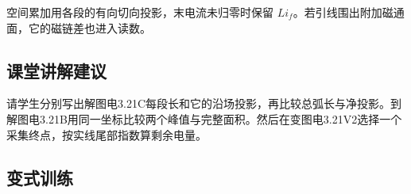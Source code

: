 \documentclass[UTF8,fontset=fandol,a4paper,11pt]{ctexart}
\begin{document}
空间累加用各段的有向切向投影，末电流未归零时保留 $Li_f$。若引线围出附加磁通面，它的磁链差也进入读数。



\subsection*{课堂讲解建议}

请学生分别写出解图电3.21C每段长和它的沿场投影，再比较总弧长与净投影。到解图电3.21B用同一坐标比较两个峰值与完整面积。然后在变图电3.21V2选择一个采集终点，按实线尾部指数算剩余电量。


\subsection*{变式训练}
\end{document}
